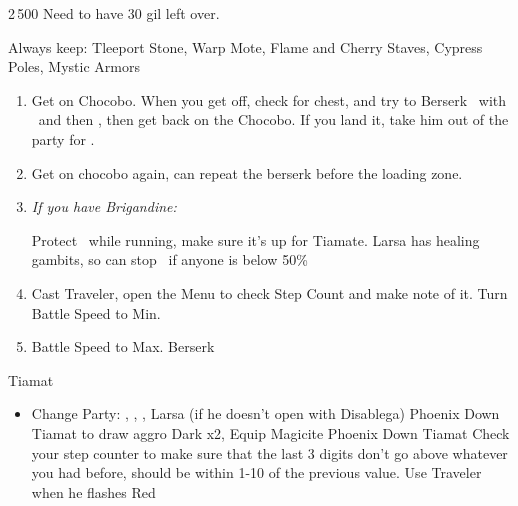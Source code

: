 \begin{shop}{2\,500}
Need to have 30 gil left over.

Always keep: Tleeport Stone, Warp Mote, Flame and Cherry Staves, Cypress Poles, Mystic Armors
\end{shop}
\begin{enumerate}
	\item Get on Chocobo. When you get off, check for chest, and try to Berserk \basch\ with \penelo\ and then \vaan, then get back on the Chocobo. If you land it, take him out of the party for \balthier.
	\item Get on chocobo again, can repeat the berserk before the loading zone.
	     \item \textit{If you have Brigandine:}
	     \begin{enumerate}
	     	\vaanf Protect \vaan\ while running, make sure it's up for Tiamate. Larsa has healing gambits, so can stop \flee\ if anyone is below 50\%
		\end{enumerate}
	\item Cast Traveler, open the Menu to check Step Count and make note of it. Turn Battle Speed to Min.
	\item Battle Speed to Max. Berserk \balthier
\end{enumerate}
\begin{battle}{Tiamat}
	\begin{itemize}
		\item Change Party: \vaan, \balthier, \basch, Larsa (if he doesn't open with Disablega)
		\vaanf Phoenix Down Tiamat to draw aggro
		\vaanf Dark x2, Equip Magicite
		\vaanf Phoenix Down Tiamat
	      \balthierf Check your step counter to make sure that the last 3 digits don't go above whatever you had before, should be within 1-10 of the previous value. Use Traveler when he flashes Red
	\end{itemize}
\end{battle}
